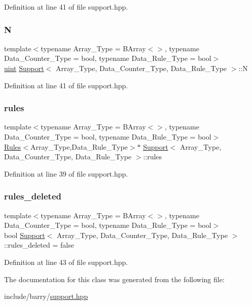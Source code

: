 Definition at line 41 of file support.\+hpp.

\mbox{\label{class_support_a6c6f707fae03f409c556b6d4668617af}} 
\subsubsection{\texorpdfstring{N}{N}}
{\footnotesize\ttfamily template$<$typename Array\+\_\+\+Type = B\+Array$<$$>$, typename Data\+\_\+\+Counter\+\_\+\+Type = bool, typename Data\+\_\+\+Rule\+\_\+\+Type = bool$>$ \\
\hyperlink{typedefs_8hpp_a91ad9478d81a7aaf2593e8d9c3d06a14}{uint} \hyperlink{class_support}{Support}$<$ Array\+\_\+\+Type, Data\+\_\+\+Counter\+\_\+\+Type, Data\+\_\+\+Rule\+\_\+\+Type $>$\+::N}



Definition at line 41 of file support.\+hpp.

\mbox{\label{class_support_a6fc8b2206c3755acbd26d9439e100f3d}} 
\subsubsection{\texorpdfstring{rules}{rules}}
{\footnotesize\ttfamily template$<$typename Array\+\_\+\+Type = B\+Array$<$$>$, typename Data\+\_\+\+Counter\+\_\+\+Type = bool, typename Data\+\_\+\+Rule\+\_\+\+Type = bool$>$ \\
\hyperlink{class_rules}{Rules}$<$Array\+\_\+\+Type,Data\+\_\+\+Rule\+\_\+\+Type$>$$\ast$ \hyperlink{class_support}{Support}$<$ Array\+\_\+\+Type, Data\+\_\+\+Counter\+\_\+\+Type, Data\+\_\+\+Rule\+\_\+\+Type $>$\+::rules}



Definition at line 39 of file support.\+hpp.

\mbox{\label{class_support_aab64eca42c25f48f7688eae0bbe9f1ef}} 
\subsubsection{\texorpdfstring{rules\+\_\+deleted}{rules\_deleted}}
{\footnotesize\ttfamily template$<$typename Array\+\_\+\+Type = B\+Array$<$$>$, typename Data\+\_\+\+Counter\+\_\+\+Type = bool, typename Data\+\_\+\+Rule\+\_\+\+Type = bool$>$ \\
bool \hyperlink{class_support}{Support}$<$ Array\+\_\+\+Type, Data\+\_\+\+Counter\+\_\+\+Type, Data\+\_\+\+Rule\+\_\+\+Type $>$\+::rules\+\_\+deleted = false}



Definition at line 43 of file support.\+hpp.



The documentation for this class was generated from the following file\+:\begin{DoxyCompactItemize}
\item 
include/barry/\hyperlink{support_8hpp}{support.\+hpp}\end{DoxyCompactItemize}
